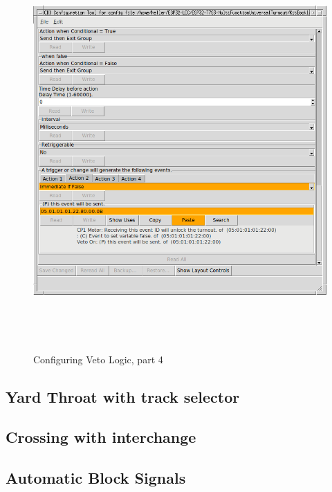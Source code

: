 \documentclass[12pt,twoside]{article}
\begin{document}
\begin{figure}[hbpt]\begin{centering}%
\includegraphics[height=6in]{ExampleSidingCP1-ConfigVetoLogic1d.png}
\caption{Configuring Veto Logic, part 4}
\label{fig:ExampleSidingCP1-ConfigVetoLogic1d}
\end{centering}\end{figure}



\clearpage
\subsection{Yard Throat with track selector}
\label{sect-appl:yardthroat}

\subsection{Crossing with interchange}
\label{sect-appl:crossinginterchange}

\subsection{Automatic Block Signals}
\label{sect-appl:ABS}
\end{document}
